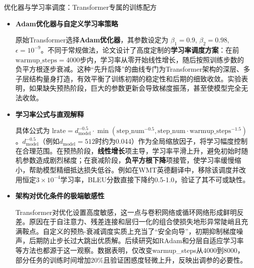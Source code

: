 \documentclass[11pt]{beamer}
\begin{document}
\begin{frame}{优化器与学习率调度：Transformer专属的训练配方}
\begin{itemize}
    \item \textbf{Adam优化器与自定义学习率策略}
    
    原始Transformer选择\textbf{Adam优化器}，其参数设定为 $\beta_1=0.9$, $\beta_2=0.98$, $\epsilon=10^{-9}$。不同于常规做法，论文设计了高度定制的\textbf{学习率调度方案}：在前$\text{warmup\_steps}=4000$步内，学习率从零开始线性增长，随后按照训练步数的负平方根逐步衰减。这种“先升后降”的曲线专门为Transformer架构的深层、多子层结构量身打造，有效平衡了训练初期的稳定性和后期的细致收敛。实验表明，如果缺失预热阶段，巨大的参数更新会导致梯度振荡，甚至使模型完全无法收敛。

    \item \textbf{学习率公式与直观解释}
    
    具体公式为 $\text{lrate} = d_{\text{model}}^{-0.5} \cdot \min(\text{step\_num}^{-0.5}, \text{step\_num} \cdot \text{warmup\_steps}^{-1.5})$。$d_{\text{model}}^{-0.5}$（例如$d_{\text{model}}=512$时约为0.044）作为全局缩放因子，将学习幅度控制在合理范围。在预热阶段，\textbf{线性增长}项主导，学习率平滑上升，避免初始时随机参数造成剧烈梯度；在衰减阶段，\textbf{负平方根下降}项接管，使学习率缓慢缩小，帮助模型精细抵达损失低谷。例如在WMT英德翻译中，移除该调度并改用恒定$3\times10^{-4}$学习率，BLEU分数直接下降约0.5-1.0，验证了其不可或缺性。

    \item \textbf{架构对优化条件的极端敏感性}
    
    \alert{Transformer对优化设置高度敏感}，这一点与卷积网络或循环网络形成鲜明反差。原因在于自注意力、残差连接和层归一化的组合使损失地形异常陡峭且充满鞍点。自定义的预热-衰减调度实质上充当了“安全向导”，初期抑制梯度噪声，后期防止步长过大跳出优质解。后续研究如RAdam和分层自适应学习率等方法也都源于这一观察。数据表明，仅改变warmup\_steps从4000到8000，部分任务的训练时间增加20\%且验证困惑度轻微上升，反映出调参的必要性。
\end{itemize}
\end{frame}
\end{document}
